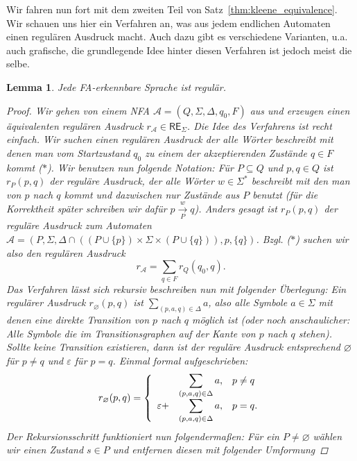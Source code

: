 \documentclass[11pt, a4paper]{article}
\theoremstyle{definition}
\theoremstyle{plain}
\newtheorem{lemma}[definition]{Lemma}
\numberwithin{equation}{section}
\newcommand{\reachess}[2]{\overset{#1}{\underset{#2}{\rightarrow}}}
\let\emptyset\varnothing
\begin{document}
Wir fahren nun fort mit dem zweiten Teil von Satz~\ref{thm:kleene_equivalence}. Wir schauen uns hier ein Verfahren an, was aus jedem endlichen Automaten einen regulären Ausdruck macht. Auch dazu gibt es verschiedene Varianten, u.a. auch grafische, die grundlegende Idee hinter diesen Verfahren ist jedoch meist die selbe.
\begin{lemma}\label{lem:nfa2regex}
	Jede FA-erkennbare Sprache ist regulär.
	\begin{proof}
		Wir gehen von einem NFA \( \mathcal{A} = (Q, \Sigma, \Delta, q_0, F) \) aus und erzeugen einen äquivalenten regulären Ausdruck \( r_\mathcal{A} \in \mathsf{RE}_\Sigma \). Die Idee des Verfahrens ist recht einfach. Wir suchen einen regulären Ausdruck der alle Wörter beschreibt mit denen man vom Startzustand \( q_0 \) zu einem der akzeptierenden Zustände \( q \in F \) kommt (\(\ast\)). Wir benutzen nun folgende Notation: Für \( P \subseteq Q \) und \( p, q \in Q \) ist \( r_P(p, q) \) der reguläre Ausdruck, der alle Wörter \( w \in \Sigma^\ast \) beschreibt mit den man von \( p \) nach \( q \) kommt und dazwischen nur Zustände aus \( P \) benutzt (für die Korrektheit später schreiben wir dafür \( p \reachess{w}{P} q \)). Anders gesagt ist \( r_P(p, q) \) der reguläre Ausdruck zum Automaten \( \mathcal{A} = (P, \Sigma, \Delta \cap ((P \cup \{p\}) \times \Sigma \times (P \cup \{q\})), p, \{q\}) \). Bzgl. (\(\ast\)) suchen wir also den regulären Ausdruck
		\[
			r_\mathcal{A} = \sum_{q \in F} r_Q(q_0, q).
		\]
		Das Verfahren lässt sich rekursiv beschreiben nun mit folgender Überlegung: Ein regulärer Ausdruck \( r_\emptyset(p, q) \) ist \( \sum_{(p, a, q) \in \Delta} a \), also alle Symbole \( a \in \Sigma \) mit denen eine direkte Transition von \( p \) nach \( q \) möglich ist (oder noch anschaulicher: Alle Symbole die im Transitionsgraphen auf der Kante von \( p \) nach \( q \) stehen). Sollte keine Transition existieren, dann ist der reguläre Ausdruck entsprechend \( \emptyset \) für \( p \neq q \) und \( \varepsilon \) für \( p = q \). Einmal formal aufgeschrieben:
		\[
			r_\emptyset(p, q) = \left\lbrace
				\begin{array}{*3{>{\displaystyle}l}p{5cm}}
					\ &\sum_{(p, a, q) \in \Delta} a, & p \neq q\\
					\varepsilon + &\sum_{(p, a, q) \in \Delta} a, & p = q.
				\end{array}
			\right.
		\]
		Der Rekursionsschritt funktioniert nun folgendermaßen: Für ein \( P \neq \emptyset \) wählen wir einen Zustand  \( s \in P \) und entfernen diesen mit folgender Umformung

\end{proof}
\end{lemma}
\end{document}

